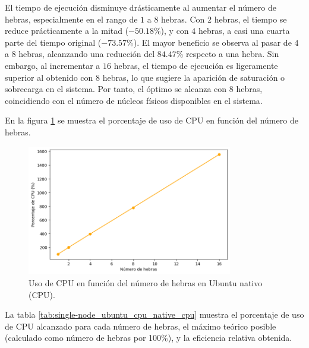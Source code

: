 El tiempo de ejecución disminuye drásticamente al aumentar el número de hebras, especialmente en el rango de $1$ a $8$ hebras. Con $2$ hebras, el tiempo se reduce prácticamente a la mitad ($-50.18\%$), y con $4$ hebras, a casi una cuarta parte del tiempo original ($-73.57\%$). El mayor beneficio se observa al pasar de $4$ a $8$ hebras, alcanzando una reducción del $84.47\%$ respecto a una hebra. Sin embargo, al incrementar a $16$ hebras, el tiempo de ejecución es ligeramente superior al obtenido con $8$ hebras, lo que sugiere la aparición de saturación o sobrecarga en el sistema. Por tanto, el óptimo se alcanza con $8$ hebras, coincidiendo con el número de núcleos físicos disponibles en el sistema.

En la figura \ref{fig:single-node_ubuntu_cpu_native_cpu} se muestra el porcentaje de uso de CPU en función del número de hebras.

\begin{figure}[ht]
    \centering
    \includegraphics[width=0.8\textwidth]{imagenes/cap5/single-node_ubuntu_cpu_native_cpu.png}
    \caption{Uso de CPU en función del número de hebras en Ubuntu nativo (CPU).}
    \label{fig:single-node_ubuntu_cpu_native_cpu}
\end{figure}

La tabla \ref{tab:single-node_ubuntu_cpu_native_cpu} muestra el porcentaje de uso de CPU alcanzado para cada número de hebras, el máximo teórico posible (calculado como número de hebras por 100\%), y la eficiencia relativa obtenida.

